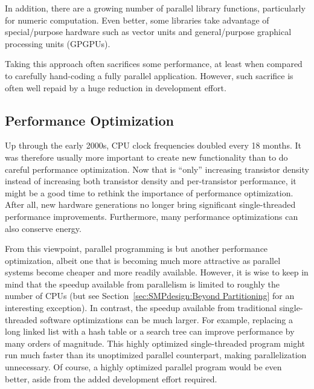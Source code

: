 In addition, there are a growing number of parallel library functions,
particularly for numeric computation.
Even better, some libraries take advantage of special\-/purpose
hardware such as vector units and general\-/purpose graphical processing
units (GPGPUs).

Taking this approach often sacrifices some performance, at least when
compared to carefully hand-coding a fully parallel application.
However, such sacrifice is often well repaid by a huge reduction in
development effort.

\QuickQuizEnd

\subsection{Performance Optimization}
\label{sec:intro:Performance Optimization}

Up through the early 2000s, CPU clock frequencies doubled every 18 months.
It was therefore usually more important to create new functionality than to do
careful performance optimization.
Now that  is ``only'' increasing transistor density instead
of increasing both transistor density and per-transistor performance,
it might be a good time to rethink the importance of performance
optimization.
After all, new hardware generations no longer bring significant
single-threaded performance improvements.
Furthermore, many performance optimizations can also conserve energy.

From this viewpoint, parallel programming is but another performance
optimization, albeit one that is becoming much more attractive
as parallel systems become cheaper and more readily available.
However, it is wise to keep in mind that the speedup available from
parallelism is limited to roughly the number of CPUs
(but see Section~\ref{sec:SMPdesign:Beyond Partitioning}
for an interesting exception).
In contrast, the speedup available from traditional single-threaded
software optimizations can be much larger.
For example, replacing a long linked list with a hash table
or a search tree can improve performance by many orders of magnitude.
This highly optimized single-threaded program might run much
faster than its unoptimized parallel counterpart, making parallelization
unnecessary.
Of course, a highly optimized parallel program would be even better,
aside from the added development effort required.

